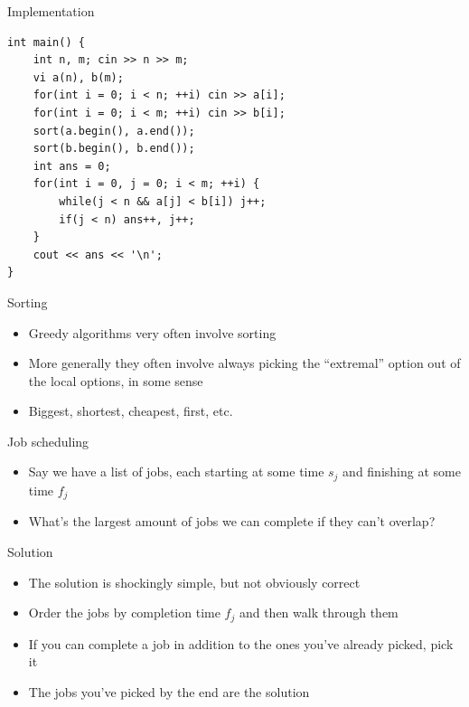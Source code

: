 \documentclass{beamer}
\begin{document}
\begin{frame}{Implementation}
\begin{verbatim}
int main() {
    int n, m; cin >> n >> m;
    vi a(n), b(m);
    for(int i = 0; i < n; ++i) cin >> a[i];
    for(int i = 0; i < m; ++i) cin >> b[i];
    sort(a.begin(), a.end());
    sort(b.begin(), b.end());
    int ans = 0;
    for(int i = 0, j = 0; i < m; ++i) {
        while(j < n && a[j] < b[i]) j++;
        if(j < n) ans++, j++;
    }
    cout << ans << '\n';
}
\end{verbatim}
\end{frame}

\begin{frame}[plain]{Sorting}
    \begin{itemize}
        \item Greedy algorithms very often involve sorting
        \item More generally they often involve always picking the ``extremal'' option out of the local options, in some sense
        \item Biggest, shortest, cheapest, first, etc.
    \end{itemize}
\end{frame}

\begin{frame}[plain]{Job scheduling}
    \begin{itemize}
        \item Say we have a list of jobs, each starting at some time $s_j$ and finishing at some time $f_j$
        \item What's the largest amount of jobs we can complete if they can't overlap?
    \end{itemize}
\end{frame}

\begin{frame}[plain]{Solution}
    \begin{itemize}
        \item The solution is shockingly simple, but not obviously correct
        \item Order the jobs by completion time $f_j$ and then walk through them
        \item If you can complete a job in addition to the ones you've already picked, pick it
        \item The jobs you've picked by the end are the solution
    \end{itemize}
\end{frame}
\end{document}
